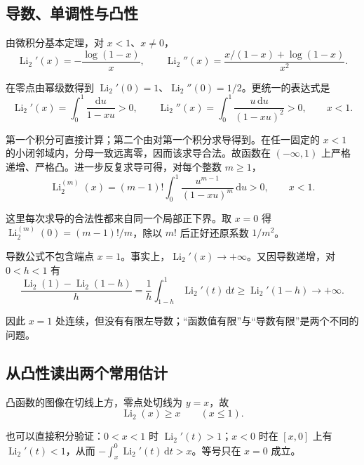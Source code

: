 \documentclass[11pt,a4paper]{article}
\begin{document}
\hypertarget{ux5bfcux6570ux5355ux8c03ux6027ux4e0eux51f8ux6027}{%
\subsection{导数、单调性与凸性}\label{ux5bfcux6570ux5355ux8c03ux6027ux4e0eux51f8ux6027}}

由微积分基本定理，对 \(x<1\)、\(x\ne0\)，
\[
\operatorname{Li}_2'(x)=-\frac{\log(1-x)}x,
\qquad
\operatorname{Li}_2''(x)=\frac{x/(1-x)+\log(1-x)}{x^2}.
\]

在零点由幂级数得到
\(\operatorname{Li}_2'(0)=1\)、\(\operatorname{Li}_2''(0)=1/2\)。更统一的表达式是
\[
\operatorname{Li}_2'(x)=\int_0^1\frac{\mathrm du}{1-xu}>0,
\qquad
\operatorname{Li}_2''(x)=\int_0^1\frac{u\,\mathrm du}{(1-xu)^2}>0,
\qquad x<1.
\]

第一个积分可直接计算；第二个由对第一个积分求导得到。在任一固定的 \(x<1\)
的小闭邻域内，分母一致远离零，因而该求导合法。故函数在 \((-\infty,1)\)
上严格递增、严格凸。进一步反复求导可得，对每个整数 \(m\geqslant1\)，
\[
\operatorname{Li}_2^{(m)}(x)
=(m-1)!\int_0^1\frac{u^{m-1}}{(1-xu)^m}\,\mathrm du>0,
\qquad x<1.
\]

这里每次求导的合法性都来自同一个局部正下界。取 \(x=0\) 得
\(\operatorname{Li}_2^{(m)}(0)=(m-1)!/m\)，除以 \(m!\) 后正好还原系数
\(1/m^2\)。

导数公式不包含端点
\(x=1\)。事实上，\(\operatorname{Li}_2'(x)\to+\infty\)。又因导数递增，对
\(0<h<1\) 有
\[
\frac{\operatorname{Li}_2(1)-\operatorname{Li}_2(1-h)}h
=\frac1h\int_{1-h}^1\operatorname{Li}_2'(t)\,\mathrm dt
\geqslant\operatorname{Li}_2'(1-h)\longrightarrow+\infty.
\]

因此 \(x=1\)
处连续，但没有有限左导数；``函数值有限''与``导数有限''是两个不同的问题。

\hypertarget{ux4eceux51f8ux6027ux8bfbux51faux4e24ux4e2aux5e38ux7528ux4f30ux8ba1}{%
\subsection{从凸性读出两个常用估计}\label{ux4eceux51f8ux6027ux8bfbux51faux4e24ux4e2aux5e38ux7528ux4f30ux8ba1}}

凸函数的图像在切线上方，零点处切线为 \(y=x\)，故
\[
\operatorname{Li}_2(x)\geqslant x\qquad(x\leqslant1).
\]

也可以直接积分验证：\(0<x<1\) 时 \(\operatorname{Li}_2'(t)>1\)；\(x<0\)
时在 \([x,0]\) 上有 \(\operatorname{Li}_2'(t)<1\)，从而
\(-\int_x^0\operatorname{Li}_2'(t)\,\mathrm dt>x\)。等号只在 \(x=0\)
成立。
\end{document}
